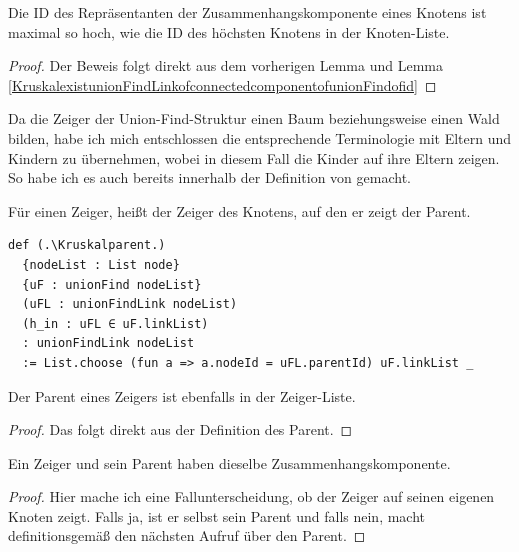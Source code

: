 \begin{lemma}[\KruskalconnectedcomponentofunionFindofidltmax]
  Die ID des Repräsentanten der Zusammenhangskomponente eines Knotens ist maximal so hoch, wie die ID des höchsten Knotens in der Knoten-Liste.
\end{lemma}
\begin{proof}
  Der Beweis folgt direkt aus dem vorherigen Lemma und Lemma \ref{KruskalexistunionFindLinkofconnectedcomponentofunionFindofid}
\end{proof}

Da die Zeiger der Union-Find-Struktur einen Baum beziehungsweise einen Wald bilden, habe ich mich entschlossen die entsprechende Terminologie mit Eltern und Kindern zu übernehmen,
wobei in diesem Fall die Kinder auf ihre Eltern zeigen.
So habe ich es auch bereits innerhalb der Definition von \KruskalconnectedcomponentofunionFindofunionFindLink gemacht.

\begin{definition}[\Kruskalparent]
  Für einen Zeiger, heißt der Zeiger des Knotens, auf den er zeigt der Parent.
\end{definition}
\begin{lstlisting}
def (.\Kruskalparent.)
  {nodeList : List node}
  {uF : unionFind nodeList}
  (uFL : unionFindLink nodeList)
  (h_in : uFL ∈ uF.linkList)
  : unionFindLink nodeList
  := List.choose (fun a => a.nodeId = uFL.parentId) uF.linkList _
\end{lstlisting}



\begin{lemma}[\Kruskalparentin]\label{Kruskalparentin}
  Der Parent eines Zeigers ist ebenfalls in der Zeiger-Liste.
\end{lemma}
\begin{proof}
  Das folgt direkt aus der Definition des Parent.
\end{proof}



\begin{lemma}[\Kruskalconparent]
  Ein Zeiger und sein Parent haben dieselbe Zusammenhangskomponente.
\end{lemma}
\begin{proof}
  Hier mache ich eine Fallunterscheidung, ob der Zeiger auf seinen eigenen Knoten zeigt.
  Falls ja, ist er selbst sein Parent und falls nein, macht \KruskalconnectedcomponentofunionFindofunionFindLink definitionsgemäß den nächsten Aufruf über den Parent.
\end{proof}




